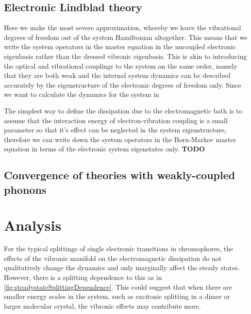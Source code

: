 \documentclass[]{article}
\begin{document}
\subsection{Electronic Lindblad theory}
\label{ssec:electronic}
Here we make the most severe approximation, whereby we leave the vibrational degrees of freedom out of the system Hamiltonian altogether. This means that we write the system operators in the master equation in the uncoupled electronic eigenbasis rather than the dressed vibronic eigenbasis. This is akin to introducing the optical and vibrational couplings to the system on the same order, namely that they are both weak and the internal system dynamics can be described accurately by the eigenstructure of the electronic degrees of freedom only. Since we want to calculate the dynamics for the system in

The simplest way to define the dissipation due to the electromagnetic bath is to assume that the interaction energy of electron-vibration coupling is a small parameter so that it's effect can be neglected in the system eigenstructure, therefore we can write down the system operators in the Born-Markov master equation in terms of the electronic system eigenstates only.
\textbf{TODO}
\subsection{Convergence of theories with weakly-coupled phonons}

\section{Analysis}
For the typical splittings of single electronic transitions in chromophores, the effects of the vibronic manifold on the electromagnetic dissipation do not qualitatively change the dynamics and only marginally affect the steady states. However, there is a splitting dependence to this as in \ref{fig:steadystateSplittingDependence}. This could suggest that when there are smaller energy scales in the system, such as excitonic splitting in a dimer or larger molecular crystal, the vibronic effects may contribute more.
\end{document}
